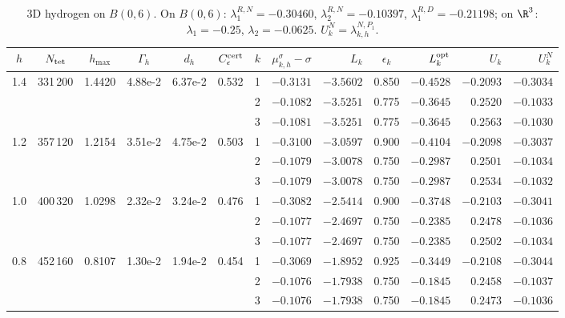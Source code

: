 \begin{table}[htbp]
\caption{3D hydrogen on $B(0,6)$. On $B(0,6)$: $\lambda_1^{R,N}=-0.30460$, $\lambda_2^{R,N}=-0.10397$, $\lambda_1^{R,D}=-0.21198$; on $\R^3$: $\lambda_1=-0.25$, $\lambda_2=-0.0625$. $U_k^N=\lambda_{k,h}^{N,P_1}$.}
\label{tab:coulomb-3d-cecr}
\centering\footnotesize
\setlength{\tabcolsep}{2.5pt}
\begin{tabular}{cccccc|crrcrrr}
\toprule
$h$ & $N_{\rm tet}$ & $h_{\max}$ & $\Gamma_h$ & $d_h$ & $C_\epsilon^{\rm cert}$ & $k$ & $\mu_{k,h}^\sigma{-}\sigma$ & $L_k$ & $\epsilon_k$ & $L_k^{\rm opt}$ & $U_k$ & $U_k^{N}$ \\
\midrule
\multirow{3}{*}{1.4} & \multirow{3}{*}{331\,200} & \multirow{3}{*}{1.4420} & \multirow{3}{*}{4.88e-2} & \multirow{3}{*}{6.37e-2} & \multirow{3}{*}{0.532} & 1 & $-0.3131$ & $-3.5602$ & 0.850 & $-0.4528$ & $-0.2093$ & $-0.3034$ \\
 & & & & & & 2 & $-0.1082$ & $-3.5251$ & 0.775 & $-0.3645$ & $0.2520$ & $-0.1033$ \\
 & & & & & & 3 & $-0.1081$ & $-3.5251$ & 0.775 & $-0.3645$ & $0.2563$ & $-0.1030$ \\
\midrule
\multirow{3}{*}{1.2} & \multirow{3}{*}{357\,120} & \multirow{3}{*}{1.2154} & \multirow{3}{*}{3.51e-2} & \multirow{3}{*}{4.75e-2} & \multirow{3}{*}{0.503} & 1 & $-0.3100$ & $-3.0597$ & 0.900 & $-0.4104$ & $-0.2098$ & $-0.3037$ \\
 & & & & & & 2 & $-0.1079$ & $-3.0078$ & 0.750 & $-0.2987$ & $0.2501$ & $-0.1034$ \\
 & & & & & & 3 & $-0.1079$ & $-3.0078$ & 0.750 & $-0.2987$ & $0.2534$ & $-0.1032$ \\
\midrule
\multirow{3}{*}{1.0} & \multirow{3}{*}{400\,320} & \multirow{3}{*}{1.0298} & \multirow{3}{*}{2.32e-2} & \multirow{3}{*}{3.24e-2} & \multirow{3}{*}{0.476} & 1 & $-0.3082$ & $-2.5414$ & 0.900 & $-0.3748$ & $-0.2103$ & $-0.3041$ \\
 & & & & & & 2 & $-0.1077$ & $-2.4697$ & 0.750 & $-0.2385$ & $0.2478$ & $-0.1036$ \\
 & & & & & & 3 & $-0.1077$ & $-2.4697$ & 0.750 & $-0.2385$ & $0.2502$ & $-0.1034$ \\
\midrule
\multirow{3}{*}{0.8} & \multirow{3}{*}{452\,160} & \multirow{3}{*}{0.8107} & \multirow{3}{*}{1.30e-2} & \multirow{3}{*}{1.94e-2} & \multirow{3}{*}{0.454} & 1 & $-0.3069$ & $-1.8952$ & 0.925 & $-0.3449$ & $-0.2108$ & $-0.3044$ \\
 & & & & & & 2 & $-0.1076$ & $-1.7938$ & 0.750 & $-0.1845$ & $0.2458$ & $-0.1037$ \\
 & & & & & & 3 & $-0.1076$ & $-1.7938$ & 0.750 & $-0.1845$ & $0.2473$ & $-0.1036$ \\
\bottomrule
\end{tabular}
\end{table}

